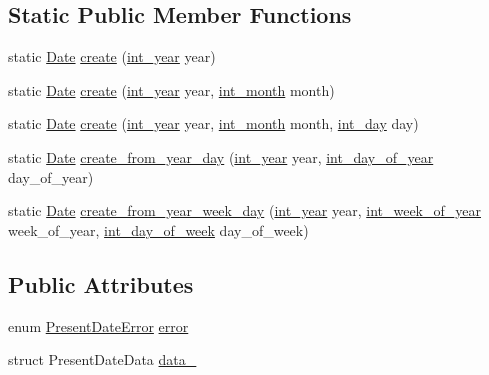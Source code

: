\subsection*{\-Static \-Public \-Member \-Functions}
\begin{DoxyCompactItemize}
\item 
static \hyperlink{structDate}{\-Date} \hyperlink{structDate_af6a6aa2e75464311dc7eee91e25aee47}{create} (\hyperlink{types_8h_a5b021e50b656f4efcc69340c01a17997}{int\-\_\-year} year)
\item 
static \hyperlink{structDate}{\-Date} \hyperlink{structDate_a0b1280e69ec6310ec8cdfb730e8dd7f6}{create} (\hyperlink{types_8h_a5b021e50b656f4efcc69340c01a17997}{int\-\_\-year} year, \hyperlink{types_8h_ae68f4f515f242b927830881ea4cffae2}{int\-\_\-month} month)
\item 
static \hyperlink{structDate}{\-Date} \hyperlink{structDate_ae0bcc2332237bf0f5b57ed646a00e6ac}{create} (\hyperlink{types_8h_a5b021e50b656f4efcc69340c01a17997}{int\-\_\-year} year, \hyperlink{types_8h_ae68f4f515f242b927830881ea4cffae2}{int\-\_\-month} month, \hyperlink{types_8h_a5269b564286b0eecff0b944afb81d4e2}{int\-\_\-day} day)
\item 
static \hyperlink{structDate}{\-Date} \hyperlink{structDate_afed458a3a1ff055cebdbd153bb00d5a4}{create\-\_\-from\-\_\-year\-\_\-day} (\hyperlink{types_8h_a5b021e50b656f4efcc69340c01a17997}{int\-\_\-year} year, \hyperlink{types_8h_a3fb1af069c4170879c1a5946cb541c69}{int\-\_\-day\-\_\-of\-\_\-year} day\-\_\-of\-\_\-year)
\item 
static \hyperlink{structDate}{\-Date} \hyperlink{structDate_a282993d00829e727eac88615cb2f1146}{create\-\_\-from\-\_\-year\-\_\-week\-\_\-day} (\hyperlink{types_8h_a5b021e50b656f4efcc69340c01a17997}{int\-\_\-year} year, \hyperlink{types_8h_a893fea48b40c218c9d3edec68cccba83}{int\-\_\-week\-\_\-of\-\_\-year} week\-\_\-of\-\_\-year, \hyperlink{types_8h_a8132950de7fc3f98373a4d384d8b6eca}{int\-\_\-day\-\_\-of\-\_\-week} day\-\_\-of\-\_\-week)
\end{DoxyCompactItemize}
\subsection*{\-Public \-Attributes}
\begin{DoxyCompactItemize}
\item 
enum \hyperlink{date_8h_a42798e6b91456e88f492437d3e826c0b}{\-Present\-Date\-Error} \hyperlink{structDate_adb2a42cb857f6462788b856b2f60cfb2}{error}
\item 
struct \-Present\-Date\-Data \hyperlink{structDate_a15a7ce699435bf3c9c60bfff5e1806de}{data\-\_\-}
\end{DoxyCompactItemize}
